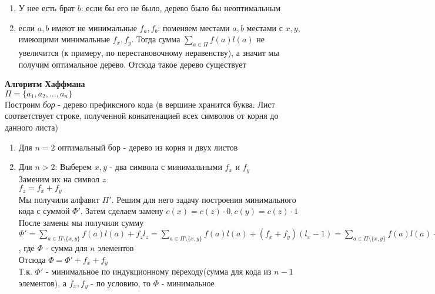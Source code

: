 \documentclass[12pt]{article}
\begin{document}
\begin{enumerate}
    \item У нее есть брат $b$: если бы его не было, дерево было бы неоптимальным
    \item если $a,b$ имеют не минимальные $f_a,f_b$: поменяем местами $a,b$ местами с $x,y$, имеющими минимальные $f_x,f_y$. Тогда сумма $\sum_{a\in\Pi} f(a)l(a)$ не увеличится (к примеру, по перестановочному неравенству), а значит мы получим оптимальное дерево. Отсюда такое дерево существует
\end{enumerate}
\textbf{Алгоритм Хаффмана}\\
$\Pi = \{a_1,a_2,\ldots,a_n\}$\\
Построим \textit{бор} - дерево префиксного кода (в вершине хранится буква. Лист соответствует строке, полученной конкатенацией всех символов от корня до данного листа)\\
\begin{enumerate}
    \item Для $n = 2$ оптимальный бор - дерево из корня и двух листов
    \item Для $n > 2$:
    Выберем $x,y$ - два символа с минимальными $f_x$ и $f_y$\\
    Заменим их на символ $z$\\
    $f_z = f_x + f_y$\\
    Мы получили алфавит $\Pi'$. Решим для него задачу построения минимального кода с суммой $\Phi'$. Затем сделаем замену $c(x) = c(z)\cdot0, c(y) = c(z)\cdot1$\\
    После замены мы получили сумму\\
    $\Phi' = \sum_{a\in\Pi\setminus \{x,y\}} f(a)l(a) + f_zl_z = \sum_{a\in\Pi\setminus \{x,y\}} f(a)l(a) + (f_x+f_y)(l_x-1) = \sum_{a\in\Pi\setminus \{x,y\}} f(a)l(a) + f_xl_x+f_yl_y - (f_x+f_y) = \Phi - (f_x+f_y)$, где $\Phi$ - сумма для $n$ элементов\\
    Отсюда $\Phi = \Phi'+f_x+f_y$\\
    Т.к. $\Phi'$ - минимальное по индукционному переходу(сумма для кода из $n-1$ элементов), а $f_x, f_y$ - по условию, то $\Phi$ -  минимальное
\end{enumerate}
\end{document}
